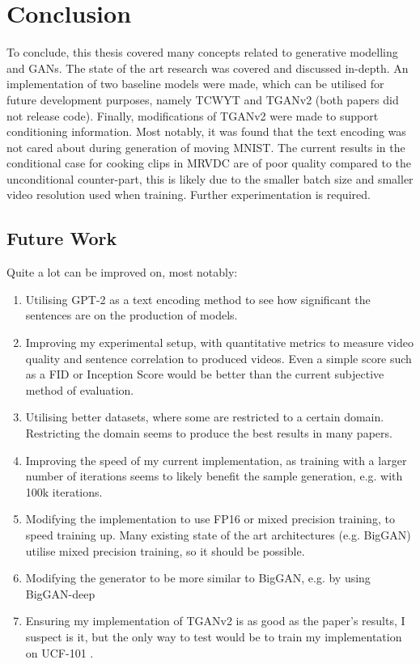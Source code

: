 \documentclass{report}
\newcommand\blankpage{%
    \null
    \thispagestyle{empty}%
    \addtocounter{page}{-1}%
    \newpage}
\theoremstyle{plain}
\theoremstyle{definition}
\theoremstyle{remark}
\numberwithin{equation}{section}
\numberwithin{figure}{section}
\newcommand{\<}{\langle}
\renewcommand{\>}{\rangle}
\begin{document}
\blankpage
\chapter{Conclusion}

To conclude, this thesis covered many concepts related to generative modelling and GANs. The state of the art research was covered and discussed in-depth. An implementation of two baseline models were made, which can be utilised for future development purposes, namely TCWYT \cite{pan_create_2018} and TGANv2 \cite{saito_temporal_2016} (both papers did not release code). Finally, modifications of TGANv2 were made to support conditioning information. Most notably, it was found that the text encoding was not cared about during generation of moving MNIST. The current results in the conditional case for cooking clips in MRVDC are of poor quality compared to the unconditional counter-part, this is likely due to the smaller batch size and smaller video resolution used when training. Further experimentation is required.

\section{Future Work}
Quite a lot can be improved on, most notably:

\begin{enumerate}
    \item Utilising GPT-2 as a text encoding method to see how significant the sentences are on the production of models.
    \item Improving my experimental setup, with quantitative metrics to measure video quality and sentence correlation to produced videos. Even a simple score such as a FID or Inception Score would be better than the current subjective method of evaluation.
    \item Utilising better datasets, where some are restricted to a certain domain. Restricting the domain seems to produce the best results in many papers. 
    \item Improving the speed of my current implementation, as training with a larger number of iterations seems to likely benefit the sample generation, e.g. with 100k iterations.
    \item Modifying the implementation to use FP16 or mixed precision training, to speed training up. Many existing state of the art architectures (e.g. BigGAN) utilise mixed precision training, so it should be possible.
    \item Modifying the generator to be more similar to BigGAN, e.g. by using BigGAN-deep
    \item Ensuring my implementation of TGANv2 is as good as the paper's results, I suspect is it, but the only way to test would be to train my implementation on UCF-101 \cite{noauthor_ucf101_nodate}.
\end{enumerate}



\end{document}
